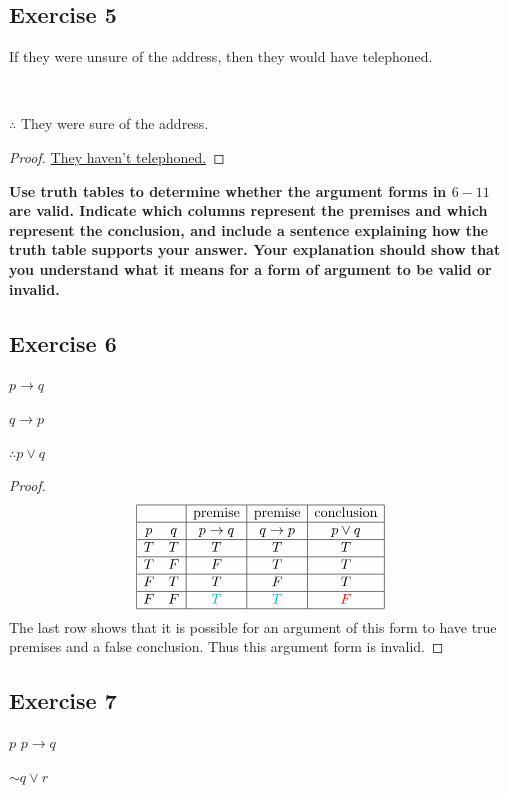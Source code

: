 \documentclass[14pt]{extarticle}
\newcommand{\fbl}{\underline{\hspace{1cm}}\,\,}
\begin{document}
\subsection{Exercise 5} 
If they were unsure of the address, then they would have telephoned.

\fbl

$\therefore$ They were sure of the address.

\begin{proof} 
\underline{They haven't telephoned.} 
\end{proof}

{\bf \color{cyan} Use truth tables to determine whether the argument forms in $6-11$ are valid. Indicate which columns represent the premises and which represent the conclusion, and include a sentence explaining how the truth table supports your answer. Your explanation should show that you understand what it
means for a form of argument to be valid or invalid.}

\subsection{Exercise 6} 
$p \to q$

$q \to p$

$\therefore p \vee q$

\begin{proof} 
$$ 
\begin{array}{|cc|c|c|c|} 
\hline 
& & \text{premise} & \text{premise} & \text{conclusion} \\ \hline 
p & q & p \to q & q \to p & p \vee q \\ 
\hline 
T & T & T & T & T \\ 
\hline 
T & F & F & T & T \\ 
\hline 
F & T & T & F & T \\ 
\hline 
F & F & \color{cyan} T & \color{cyan} T & \color{red} F \\
\hline 
\end{array} 
$$ 
The last row shows that it is possible for an argument of
this form to have true premises and a false conclusion. Thus this argument form is invalid. 
\end{proof}

\subsection{Exercise 7} $p$
$p \to q$

${\sim q} \vee r$
\end{document}
